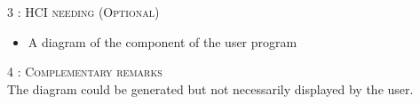 \begin{flushleft}
    \BlackLine
    \textsc{\Large 3 : HCI needing (Optional)}\\[0.3cm]

    \begin{itemize}
        \item A diagram of the component of the user program
    \end{itemize}

    \BlackLine
    \textsc{\Large 4 : Complementary remarks}\\[0.3cm]

    The diagram could be generated but not necessarily displayed by the user.

\end{flushleft}
